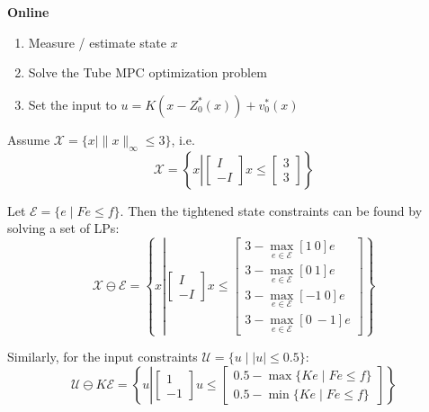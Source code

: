 \textbf{Online}
\begin{enumerate}
    \item Measure / estimate state $x$
    \item Solve the Tube MPC optimization problem
    \item Set the input to $u = K(x-Z_0^*(x))+v_0^*(x)$
\end{enumerate}

\begin{examplesection}
    Assume $\mathcal{X} = \{x \mid \|x\|_\infty \leq 3\}$, i.e.
    \begin{equation*}
        \mathcal{X} = \left\{ x \left|
        \begin{bmatrix}
            I \\ -I
        \end{bmatrix} x \leq
        \begin{bmatrix}
            3 \\ 3
        \end{bmatrix}
        \right. \right\}
    \end{equation*}

    Let $\mathcal{E} = \{e \mid F e \leq f\}$. Then the tightened state constraints can be found by solving a set of LPs:
    \begin{equation*}
        \mathcal{X} \ominus \mathcal{E} = \left\{ x \left|
        \begin{bmatrix}
            I \\ -I
        \end{bmatrix} x \leq
        \begin{bmatrix}
            3 - \max\limits_{e \in \mathcal{E}} [1 \ 0] e  \\
            3 - \max\limits_{e \in \mathcal{E}} [0 \ 1] e  \\
            3 - \max\limits_{e \in \mathcal{E}} [-1 \ 0] e \\
            3 - \max\limits_{e \in \mathcal{E}} [0 \ -1] e
        \end{bmatrix}
        \right. \right\}
    \end{equation*}

    Similarly, for the input constraints $\mathcal{U} = \{u \mid |u| \leq 0.5\}$:
    \begin{equation*}
        \mathcal{U} \ominus K \mathcal{E} = \left\{ u \left|
        \begin{bmatrix}
            1 \\ -1
        \end{bmatrix} u \leq
        \begin{bmatrix}
            0.5 - \max\{K e \mid F e \leq f\} \\
            0.5 - \min\{K e \mid F e \leq f\}
        \end{bmatrix}
        \right. \right\}
    \end{equation*}
\end{examplesection}

